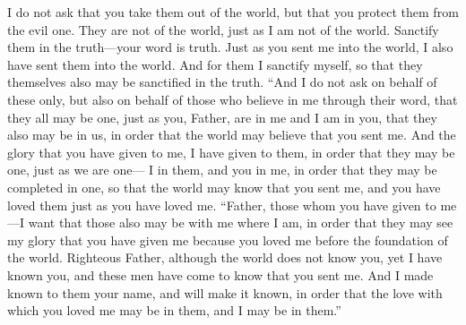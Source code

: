 \begin{biblechapter}
\verse I do not ask that you take them out of the world, but that you protect them from the evil one.
\verse They are not of the world, just as I am not of the world.
\verse Sanctify them in the truth—your word is truth.
\verse Just as you sent me into the world, I also have sent them into the world.
\verse And for them I sanctify myself, so that they themselves also may be sanctified in the truth.
 “And I do not ask on behalf of these only, but also on behalf of those who believe in me through their word,
\verse that they all may be one, just as you, Father, are in me and I am in you, that they also may be in us, in order that the world may believe that you sent me.
\verse And the glory that you have given to me, I have given to them, in order that they may be one, just as we are one—
\verse I in them, and you in me, in order that they may be completed in one, so that the world may know that you sent me, and you have loved them just as you have loved me.
\verse “Father, those whom you have given to me—I want that those also may be with me where I am, in order that they may see my glory that you have given me because you loved me before the foundation of the world.
\verse Righteous Father, although the world does not know you, yet I have known you, and these men have come to know that you sent me.
\verse And I made known to them your name, and will make it known, in order that the love with which you loved me may be in them, and I may be in them.”
\end{biblechapter}

